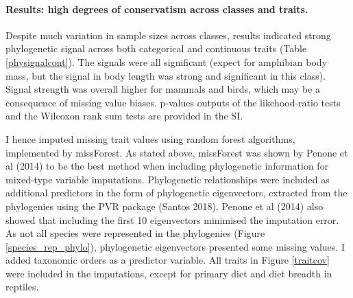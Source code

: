 \paragraph{Results: high degrees of conservatism across classes and traits.}
Despite much variation in sample sizes across classes, results indicated strong phylogenetic signal across both categorical and continuous traits (Table \ref{physignalcont}). The signals were all significant (expect for amphibian body mass, but the signal in body length was strong and significant in this class). Signal strength was overall higher for mammals and birds, which may be a consequence of missing value biases. p-values outputs of the likehood-ratio tests and the Wilcoxon rank sum tests are provided in the SI.

I hence imputed missing trait values using random forest algorithms, implemented by missForest. As stated above, missForest was shown by Penone et al (2014) to be the best method when including phylogenetic information for mixed-type variable imputations. Phylogenetic relationships were included as additional predictors in the form of phylogenetic eigenvectors, extracted from the phylogenies using the PVR package (Santos 2018). Penone et al (2014) also showed that including the first 10 eigenvectors minimised the imputation error. As not all species were represented in the phylogenies (Figure \ref{species_rep_phylo}), phylogenetic eigenvectors presented some missing values. I added taxonomic orders as a predictor variable. All traits in Figure \ref{traitcov} were included in the imputations, except for primary diet and diet breadth in reptiles.


